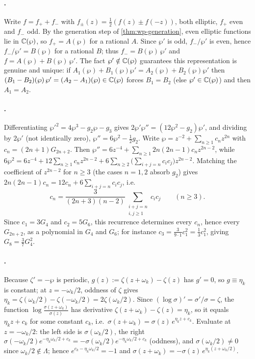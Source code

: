 \paragraph{.}
Write \(f = f_+ + f_-\) with \(f_\pm(z) = \tfrac12(f(z) \pm f(-z))\), both
elliptic, \(f_+\) even and \(f_-\) odd. By the generation step of
\cref{thm:wp-generation}, even elliptic functions lie in \(\mathbb{C}(\wp)\), so
\(f_+ = A(\wp)\) for a rational \(A\). Since \(\wp'\) is odd, \(f_-/\wp'\) is even,
hence \(f_-/\wp' = B(\wp)\) for a rational \(B\); thus \(f_- = B(\wp)\,\wp'\) and
\(f = A(\wp) + B(\wp)\,\wp'\). The fact \(\wp' \notin \mathbb{C}(\wp)\) guarantees this
representation is genuine and unique: if
\(A_1(\wp) + B_1(\wp)\wp' = A_2(\wp) + B_2(\wp)\wp'\) then
\((B_1 - B_2)(\wp)\,\wp' = (A_2 - A_1)(\wp) \in \mathbb{C}(\wp)\) forces
\(B_1 = B_2\) (else \(\wp' \in \mathbb{C}(\wp)\)) and then \(A_1 = A_2\).

\paragraph{.}
Differentiating \(\wp'^2 = 4\wp^3 - g_2\wp - g_3\) gives \(2\wp'\wp'' =
(12\wp^2 - g_2)\wp'\), and dividing by \(2\wp'\) (not identically zero),
\(\wp'' = 6\wp^2 - \tfrac12 g_2\). Write \(\wp = z^{-2} + \sum_{n\ge1} c_n z^{2n}\)
with \(c_n = (2n+1)G_{2n+2}\). Then \(\wp'' = 6z^{-4} + \sum_{n\ge1}
2n(2n-1)c_n z^{2n-2}\), while
\(6\wp^2 = 6z^{-4} + 12\sum_{n\ge1} c_n z^{2n-2} + 6\sum_{n\ge2}\bigl(\sum_{i+j=n}
c_i c_j\bigr)z^{2n-2}\). Matching the coefficient of \(z^{2n-2}\) for \(n \ge 3\)
(the cases \(n=1,2\) absorb \(g_2\)) gives \(2n(2n-1)c_n = 12c_n +
6\sum_{i+j=n}c_ic_j\), i.e.
\[
  c_n = \frac{3}{(2n+3)(n-2)}\sum_{\substack{i+j=n\\ i,j\ge1}} c_i c_j
  \qquad (n \ge 3).
\]
Since \(c_1 = 3G_4\) and \(c_2 = 5G_6\), this recurrence determines every
\(c_n\), hence every \(G_{2n+2}\), as a polynomial in \(G_4\) and \(G_6\); for
instance \(c_3 = \tfrac{3}{9\cdot1}c_1^2 = \tfrac13 c_1^2\), giving
\(G_8 = \tfrac{3}{7}G_4^2\).

\paragraph{.}
Because \(\zeta' = -\wp\) is periodic, \(g(z) := \zeta(z+\omega_k) - \zeta(z)\) has
\(g' = 0\), so \(g \equiv \eta_k\) is constant; at \(z = -\omega_k/2\), oddness of
\(\zeta\) gives \(\eta_k = \zeta(\omega_k/2) - \zeta(-\omega_k/2) = 2\zeta(\omega_k/2)\).
Since \((\log\sigma)' = \sigma'/\sigma = \zeta\), the function
\(\log\frac{\sigma(z+\omega_k)}{\sigma(z)}\) has derivative
\(\zeta(z+\omega_k) - \zeta(z) = \eta_k\), so it equals \(\eta_k z + c_k\) for some
constant \(c_k\), i.e.\ \(\sigma(z+\omega_k) = \sigma(z)\,e^{\eta_k z + c_k}\).
Evaluate at \(z = -\omega_k/2\): the left side is \(\sigma(\omega_k/2)\), the right
\(\sigma(-\omega_k/2)e^{-\eta_k\omega_k/2 + c_k} = -\sigma(\omega_k/2)
e^{-\eta_k\omega_k/2 + c_k}\) (oddness), and \(\sigma(\omega_k/2) \neq 0\) since
\(\omega_k/2 \notin \Lambda\); hence \(e^{c_k - \eta_k\omega_k/2} = -1\) and
\(\sigma(z+\omega_k) = -\sigma(z)\,e^{\eta_k(z+\omega_k/2)}\).

